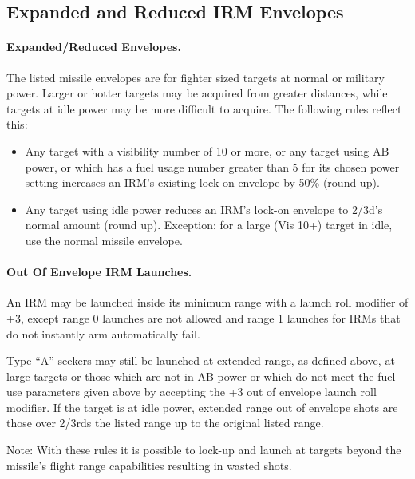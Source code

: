\subsection{Expanded and Reduced IRM Envelopes}

\paragraph{Expanded/Reduced Envelopes.} The listed missile envelopes are for fighter sized targets at normal or military power. Larger or hotter targets may be acquired from greater distances, while targets at idle power may be more difficult to acquire. The following rules reflect this:

\begin{itemize}

    \item Any target with a visibility number of 10 or more, or any target using AB power, or which has a fuel usage number greater than 5 for its chosen power setting increases an IRM's existing lock-on envelope by 50\% (round up).

    \item Any target using idle power reduces an IRM's lock-on envelope to 2/3d's normal amount (round up). Exception: for a large (Vis 10+) target in idle, use the normal missile envelope.

\end{itemize}

\paragraph{Out Of Envelope IRM Launches.} An IRM may be launched inside its minimum range with a launch roll modifier of +3, except range 0 launches are not allowed and range 1 launches for IRMs that do not instantly arm automatically fail.

Type “A” seekers may still be launched at extended range, as defined above, at large targets or those which are not in AB power or which do not meet the fuel use parameters given above by accepting the +3 out of envelope launch roll modifier. If the target is at idle power, extended range out of envelope shots are those over 2/3rds the listed range up to the original listed range.

Note: With these rules it is possible to lock-up and launch at targets beyond the missile's flight range capabilities resulting in wasted shots.